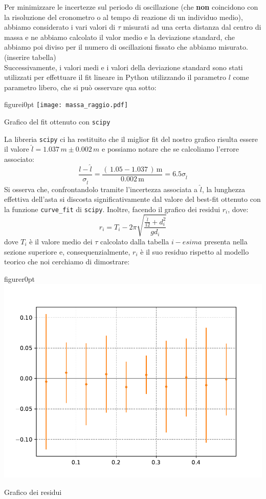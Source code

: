 \documentclass{article}
\begin{document}
Per minimizzare le incertezze sul periodo di oscillazione (che \textbf{non} coincidono con la risoluzione del cronometro o al tempo di reazione di un individuo medio), abbiamo considerato i vari valori di $\tau$ misurati ad una certa distanza dal centro di massa e ne abbiamo calcolato il valor medio e la deviazione standard, che abbiamo poi diviso per il numero di oscillazioni fissato che abbiamo misurato. (inserire tabella) \\ 
Successivamente, i valori medi e i valori della deviazione standard sono stati utilizzati per effettuare il fit lineare in Python utilizzando il parametro $l$ come parametro libero, che si può osservare qua sotto:
\\
\begin{wrapfloat}{figure}{i}{0pt}
	\texttt{[image: massa\_raggio.pdf]}
	\caption{Grafico del fit ottenuto con \texttt{scipy}}
\end{wrapfloat}
La libreria \texttt{scipy} ci ha restituito che il miglior fit del nostro grafico risulta essere il valore $\hat{l} = 1.037 \, m \pm 0.002 \, m$ e possiamo notare che se calcoliamo l'errore associato:
$$
	\frac{l - \hat{l}}{\sigma_{\hat{l}}} = \frac{(\, 1.05 - 1.037 \, ) \, \text{m}}{0.002 \, \text{m}} = 6.5 \sigma_{\hat{l}}
$$
Si osserva che, confrontandolo tramite l'incertezza associata a $\hat{l}$, la lunghezza effettiva dell'asta si discosta significativamente dal valore del best-fit ottenuto con la funzione \texttt{curve\_fit} di \texttt{scipy}. Inoltre, facendo il grafico dei residui $r_i$, dove:
\begin{equation}
	r_i = T_i - 2\pi\sqrt{\frac{\frac{\hat{l}}{12} + d_i^2}{gd_i}}
\end{equation}
dove $T_i$ è il valore medio dei $\tau$ calcolato dalla tabella $i-esima$ presenta nella sezione superiore e, consequenzialmente, $r_i$ è il suo residuo rispetto al modello teorico che noi cerchiamo di dimostrare: 
\newpage
\begin{wrapfloat}{figure}{r}{0pt}
	\includegraphics[scale=0.40]{grafico_residui.pdf}
	\caption{Grafico dei residui}
\end{wrapfloat} 
\end{document}
